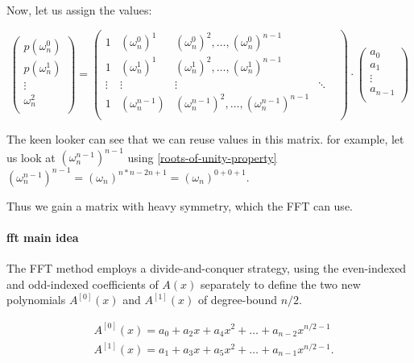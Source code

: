  Now, let us assign the values:

 \label{dft-matrix}
 $$
\begin{pmatrix}
  p(\omega_n^0)\\
  p(\omega_n^1)\\
  \vdots \\
  \omega_n^2\\
\end{pmatrix}
=
\begin{pmatrix}
  1 & (\omega_n^0)^1 & (\omega_n^0)^2 ,\dots ,(\omega_n^0)^{n-1}\\
  1 & (\omega_n^1)^1 & (\omega_n^1)^2, \dots, (\omega_n^1)^{n-1}\\
  \vdots & \vdots & \vdots & \ddots & \\
  1 & (\omega_n^{n-1}) & (\omega_n^{n-1})^2, \dots,(\omega_n^{n-1})^{n-1}\\
 \end{pmatrix}
 \cdot 
\begin{pmatrix}
  a_0\\
  a_1\\
  \vdots \\
  a_{n-1}\\
\end{pmatrix}
 $$

 The keen looker can see that we can reuse values in this matrix.
 for example, let us look at $(\omega_n^{n-1})^{n-1}$ using \ref{roots-of-unity-property}
 $(\omega_n^{n-1})^{n-1} = (\omega_n)^{n*n-2n+1}=(\omega_n)^{0+0+1}$.  

 Thus we gain a matrix with heavy symmetry, which the FFT can use.

\paragraph{fft main idea}
The FFT method employs a divide-and-conquer strategy, 
using the even-indexed and odd-indexed coefficients of $A(x)$
separately to define the two new polynomials $A^{[0]}(x)$ and $A^{[1]}(x)$ of degree-bound $n/2$.

\begin{align}
  &A^{[0]}(x) =  a_0 +a_2x + a_4x^2 + \dots + a_{n-2}x^{n/2-1}\\
  &A^{[1]}(x) =  a_1 +a_3x + a_5x^2 + \dots + a_{n-1}x^{n/2-1}.
\end{align}


